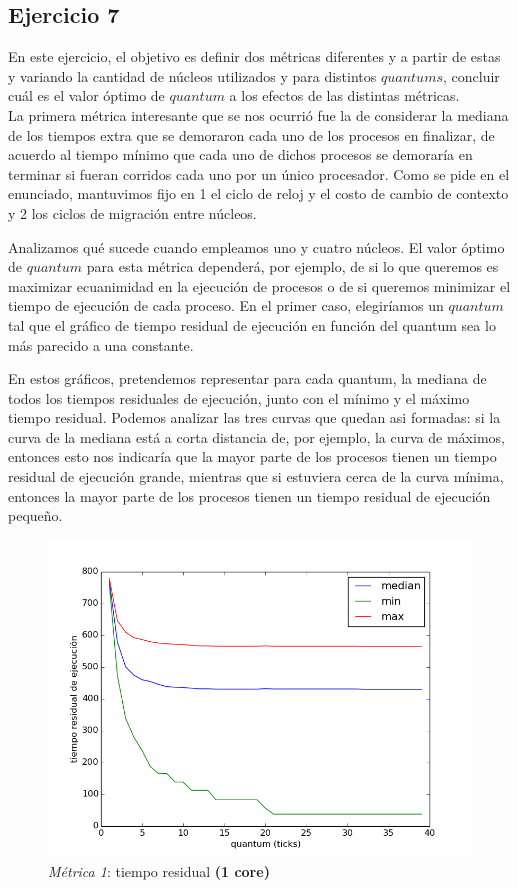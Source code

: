 \documentclass[11pt, a4paper, twoside]{article}
\begin{document}
\clearpage
\subsection{Ejercicio 7}
En este ejercicio, el objetivo es definir dos m\'etricas diferentes y a partir de estas y variando la
cantidad de n\'ucleos utilizados y para distintos $quantums$,  concluir cu\'al es el valor \'optimo de 
$quantum$ a los efectos de las distintas m\'etricas. \\
La primera m\'etrica interesante que se nos ocurri\'o fue la de considerar la mediana de los tiempos extra
que se demoraron cada uno de los procesos en finalizar, de acuerdo al tiempo m\'inimo que cada uno de dichos 
procesos se demorar\'ia en terminar si fueran corridos cada uno por un \'unico procesador. Como se pide en
el enunciado, mantuvimos fijo en 1 el ciclo de reloj y el costo de cambio de contexto y 2 los ciclos de 
migraci\'on entre n\'ucleos.

Analizamos qu\'e sucede cuando empleamos uno y cuatro n\'ucleos. El valor 
\'optimo de $quantum$ para esta m\'etrica depender\'a, por ejemplo, de si lo que queremos es maximizar 
ecuanimidad en la ejecuci\'on de procesos o de si queremos minimizar el tiempo de ejecuci\'on de cada
proceso. En el primer caso, elegir\'iamos un $quantum$ tal que el gr\'afico de tiempo residual de ejecuci\'on
en funci\'on del quantum sea lo m\'as parecido a una constante. 

En estos gráficos, pretendemos representar
para cada quantum, la mediana de todos los tiempos residuales de ejecución, junto con el mínimo
y el máximo tiempo residual. Podemos analizar las tres curvas que quedan asi formadas: si la curva de la 
mediana está a corta distancia de, por ejemplo, la curva de máximos, entonces esto nos indicaría
que la mayor parte de los procesos tienen un tiempo residual de ejecución grande, mientras que si
estuviera cerca de la curva mínima, entonces la mayor parte de los procesos tienen un tiempo residual de 
ejecución pequeño. 

\begin{figure}[H]
  \centering
  \includegraphics [width=\textwidth]{../graficos/metrica_eze_plot_batch_1core_fidedigno.png}
  \caption{\emph{Métrica 1}: tiempo residual \textbf{(1 core)}}
  \label{fig:eze-1core}
\end{figure}
\end{document}
